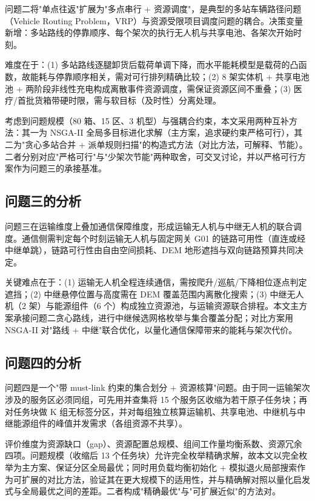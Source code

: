 问题二将"单点往返"扩展为"多点串行 + 资源调度"，是典型的多站车辆路径问题（Vehicle Routing Problem，VRP）与资源受限项目调度问题的耦合\cite{ref_dorling}。决策变量新增：多站路线的停靠顺序、每个架次的执行无人机与共享电池、各架次开始时刻。

难度在于：(1) 多站路线逐腿卸货后载荷单调下降，而水平能耗模型是载荷的凸函数，故能耗与停靠顺序相关，需对可行排列精确比较；(2) 8 架实体机 + 共享电池池 + 两阶段非线性充电构成离散事件资源调度，需保证资源区间不重叠；(3) 医疗/首批货箱带硬时限，需与软目标（及时性）分离处理。

考虑到问题规模（80 箱、15 区、3 机型）与强耦合约束，本文采用两种互补方法：其一为 NSGA-II 全局多目标进化求解（主方案，追求硬约束严格可行），其二为"贪心多站合并 + 派单规则扫描"的构造式方法（对比方法，可解释、节能）。二者分别对应"严格可行"与"少架次节能"两种取舍，可交叉讨论，并以严格可行方案作为问题三的承接基准。

\subsection{问题三的分析}

问题三在运输维度上叠加通信保障维度，形成运输无人机与中继无人机的联合调度。通信侧需判定每个时刻运输无人机与固定网关 G01 的链路可用性（直连或经中继单跳），链路可行性由自由空间损耗、DEM 地形遮挡与双向链路预算共同决定\cite{ref_itu,ref_zeng}。

关键难点在于：(1) 运输无人机全程连续通信，需按爬升/巡航/下降相位逐点判定遮挡；(2) 中继悬停位置与高度需在 DEM 覆盖范围内离散化搜索；(3) 中继无人机（2 架）与能源组件（6 个）构成独立资源池，与运输资源联合排程。本文主方案承接问题二贪心路线，进行中继候选网格枚举与集合覆盖分配；对比方案用 NSGA-II 对"路线 + 中继"联合优化，以量化通信保障带来的能耗与架次代价。

\subsection{问题四的分析}

问题四是一个"带 must-link 约束的集合划分 + 资源核算"问题。由于同一运输架次涉及的服务区必须同组，可先用并查集将 15 个服务区收缩为若干原子任务块；再对任务块做 K 组无标签分区，并对每组独立核算运输机、共享电池、中继机与中继能源组件的峰值并发需求（各组资源不共享）。

评价维度为资源缺口（gap）、资源配置总规模、组间工作量均衡系数、资源冗余四项。问题规模（收缩后 13 个任务块）允许完全枚举精确求解，故本文以完全枚举为主方案、保证分区全局最优；同时用负载均衡初始化 + 模拟退火局部搜索作为可扩展的对比方法，验证其在更大规模下的适用性，并与精确解对照以量化启发式与全局最优之间的差距。二者构成"精确最优"与"可扩展近似"的方法对。

